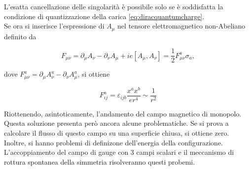 L'esatta cancellazione delle singolarità è possibile solo se è soddisfatta la condizione
di quantizzazione della carica \ref{eq:diracquantumcharge}.\\

Se ora si inserisce l'espressione di $A _\mu$ nel tensore elettromagnetico non-Abeliano
definito da

\begin{equation}
   F_{\mu\nu} = \partial _\mu A_\nu - \partial _\nu A _\mu + i e [A_\mu,A_\nu]
              = \frac{1}{2} F_{\mu\nu}^a \sigma _a ,
\end{equation}

dove $F_{\mu\nu}^a = \partial _\mu A_\nu^a - \partial _\nu A_\mu^a$, si ottiene

\begin{equation}
   F^a_{ij} = \varepsilon_{ijb} \frac{x^a x^b}{e r^4} \sim \frac{1}{r^2}
\end{equation}

Riottenendo, asintoticamente, l'andamento del campo magnetico di monopolo.\\

Questa soluzione presenta però ancora alcune problematiche. Se si prova a calcolare
il flusso di questo campo su una superficie chiusa, si ottiene zero. Inoltre, si
hanno problemi di definizone dell'energia della configurazione.\\

L'accoppiamento del campo di gauge con 3 campi scalari e il meccanismo di
rottura spontanea della simmetria risolveranno questi probemi.
